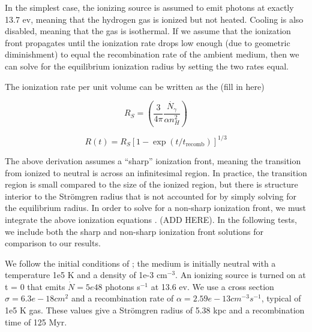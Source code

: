 In the simplest case, the ionizing source is assumed to emit photons at exactly 13.7 ev, meaning that the hydrogen gas is ionized but not heated. Cooling is also disabled, meaning that the gas is isothermal. If we assume that the ionization front propagates until the ionization rate drops low enough (due to geometric diminishment) to equal the recombination rate of the ambient medium, then we can solve for the equilibrium ionization radius by setting the two rates equal.

The ionization rate per unit volume can be written as the (fill in here)

%

\begin{equation}
\label{eq:strmogrenradius}
R_S = \left( \frac{3}{4\pi} \frac{\dot{N_{\gamma}}}{\alpha n_H^2}\right)
\end{equation}

\begin{equation}
\label{eq:stromgrentime}
R(t) = R_S[1-\exp{(t/t_{\mbox{recomb}})}]^{1/3}
\end{equation}

The above derivation assumes a ``sharp'' ionization front, meaning the transition from ionized to neutral is across an infinitesimal region. In practice, the transition region is small compared to the size of the ionized region, but there is structure interior to the Str\"omgren radius that is not accounted for by simply solving for the equilibrium radius. In order to solve for a non-sharp ionization front, we must integrate the above ionization equations \citep{osterbrockFerland2006}. (ADD HERE). In the following tests, we include both the sharp and non-sharp ionization front solutions for comparison to our results.

We follow the initial conditions of \citet{ilievEt06}; the medium is initially neutral with a temperature 1e5 K and a density of 1e-3 cm$^{-3}$. An ionizing source is turned on at t = 0 that emits $\dot{N} = 5e48$ photons s$^{-1}$ at 13.6 ev. We use a cross section $\sigma = 6.3e-18 cm^2$ and a recombination rate of $\alpha = 2.59e-13 cm^{-3} s^{-1}$, typical of 1e5 K gas. These values give a Str\"omgren radius of 5.38 kpc and a recombination time of 125 Myr.

